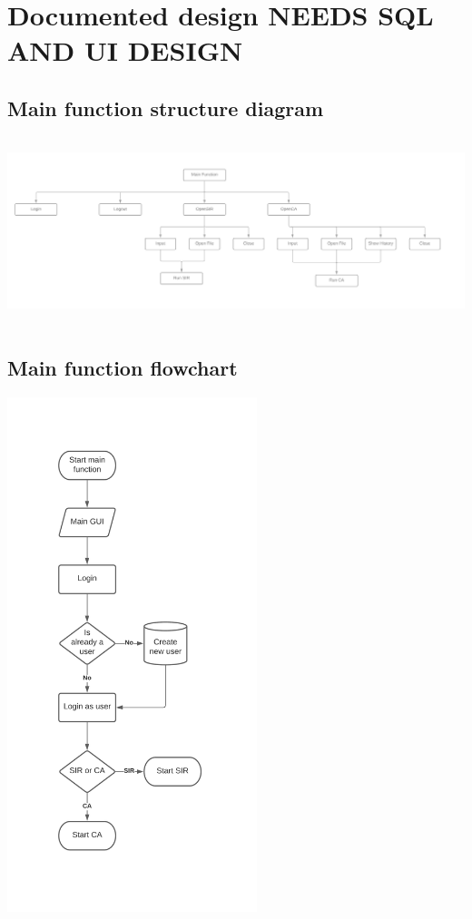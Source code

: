 \documentclass[11pt, a4paper]{article}
\begin{document}
\newpage



\newpage
\section{Documented design NEEDS SQL AND UI DESIGN}


\subsection{Main function structure diagram}
\includegraphics[height=5.43cm, width=\textwidth]{s_main_function.png}
\subsection{Main function flowchart}
\includegraphics[height=15cm]{f_main.png}
\newpage
\end{document}
